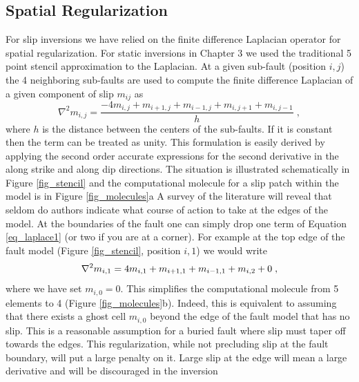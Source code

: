 \subsection{Spatial Regularization}

For slip inversions we have relied on the finite difference Laplacian operator for spatial regularization. For static inversions in Chapter 3 we used the traditional 5 point stencil approximation to the Laplacian. At a given sub-fault (position $i,j$) the 4 neighboring sub-faults are used to compute the finite difference Laplacian of a given component of  slip $m_{ij}$ as
\begin{equation}
\label{eq_laplace1}
\nabla^2m_{i,j}=\frac{-4m_{i,j}+m_{i+1,j}+m_{i-1,j}+m_{i,j+1}+m_{i,j-1}}{h}\;,
\end{equation}
where $h$ is the distance between the centers of the sub-faults. If it is constant then the term can be treated as unity. This formulation is easily derived by applying the second order accurate expressions for the second derivative in the along strike and along dip directions.  The situation is illustrated schematically in Figure \ref{fig_stencil} and the computational molecule for a slip patch within the model is in Figure \ref{fig_molecules}a  A survey of the literature will reveal that seldom do authors indicate what course of action to take at the edges of the model. At the boundaries of the fault one can simply drop one term of Equation \ref{eq_laplace1} (or two if you are at a corner). For example at the top edge of the fault model  (Figure \ref{fig_stencil}, position $i,1$) we would write
\begin{equation}
\label{eq_laplace2}
\nabla^2m_{i,1}=\-4m_{i,1}+m_{i+1,1}+m_{i-1,1}+m_{i,2}+0\;,
\end{equation}
where we have set $m_{i,0}=0$. This simplifies the computational molecule from 5 elements to 4 (Figure \ref{fig_molecules}b). Indeed, this is equivalent to assuming that there exists a ghost cell $m_{i,0}$ beyond the edge of the fault model that has no slip. This is a reasonable assumption for a buried fault where slip must taper off towards the edges. This regularization, while not precluding slip at the fault boundary, will put a large penalty on it. Large slip at the edge will mean a large derivative and will be discouraged in the inversion

